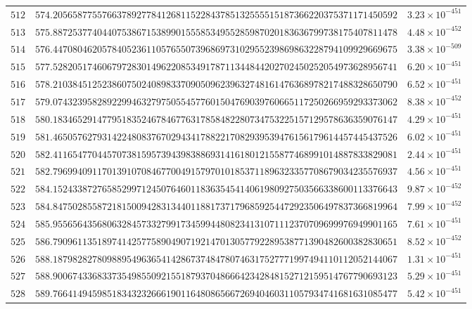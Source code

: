 \documentclass[12pt,reqno]{amsart}
\theoremstyle{remark}
\begin{document}
\begin{longtable}{clc}
$512$ & $574.2056587755766378927784126811522843785132555515187366220375371171450592$ & $3.23\times 10^{-451}$ \\
$513$ & $575.8872537740440753867153899015558534955285987020183636799738175407811478$ & $4.48\times 10^{-452}$ \\
$514$ & $576.4470804620578405236110576550739686973102955239869863228794109929669675$ & $3.38\times 10^{-509}$ \\
$515$ & $577.5282051746067972830149622085349178711344844202702450252054973628956741$ & $6.20\times 10^{-451}$ \\
$516$ & $578.2103845125238607502408983370905096239632748161476368978217488328650790$ & $6.52\times 10^{-451}$ \\
$517$ & $579.0743239582892299463279750554577601504769039760665117250266959293373062$ & $8.38\times 10^{-452}$ \\
$518$ & $580.1834652914779518352467846776317858482280734753225157129578636359076147$ & $4.29\times 10^{-451}$ \\
$519$ & $581.4650576279314224808376702943417882217082939539476156179614457445437526$ & $6.02\times 10^{-451}$ \\
$520$ & $582.4116547704457073815957394398388693141618012155877468991014887833829081$ & $2.44\times 10^{-451}$ \\
$521$ & $582.7969940911701391070846770049157970101853711896323357708679034235576937$ & $4.56\times 10^{-451}$ \\
$522$ & $584.1524338727658529971245076460118363545414061980927503566338600113376643$ & $9.87\times 10^{-452}$ \\
$523$ & $584.8475028558721815009428313440118817371796859254472923506497837366819964$ & $7.99\times 10^{-452}$ \\
$524$ & $585.9556564356806328457332799173459944808234131071112370709699976949901165$ & $7.61\times 10^{-451}$ \\
$525$ & $586.7909611351897414257758904907192147013057792289538771390482600382830651$ & $8.52\times 10^{-452}$ \\
$526$ & $588.1879828278098895496365414286737484780746317527771997494110112052144067$ & $1.31\times 10^{-451}$ \\
$527$ & $588.9006743368337354985509215518793704866642342848152712159514767790693123$ & $5.29\times 10^{-451}$ \\
$528$ & $589.7664149459851834323266619011648086566726940460311057934741681631085477$ & $5.42\times 10^{-451}$ \\

\end{longtable}
\end{document}
